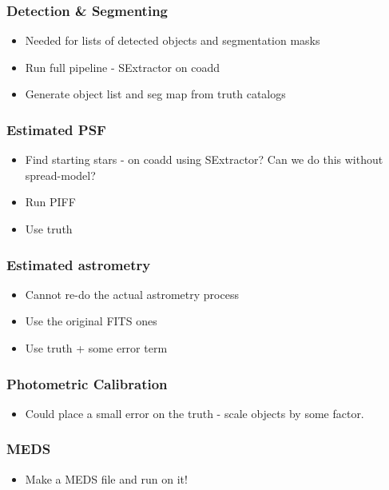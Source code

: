 \documentclass[\docopts]{\docclass}
\begin{document}
\subsubsection{Detection \& Segmenting}
\begin{itemize}
\item Needed for lists of detected objects and segmentation masks
\item Run full pipeline - SExtractor on coadd
\item Generate object list and seg map from truth catalogs
\end{itemize}

\subsubsection{Estimated PSF}
\begin{itemize}
\item Find starting stars - on coadd using SExtractor? Can we do this without spread-model?
\item Run PIFF
\item Use truth
\end{itemize}

\subsubsection{Estimated astrometry}
\begin{itemize}
\item Cannot re-do the actual astrometry process
\item Use the original FITS ones
\item Use truth + some error term
\end{itemize}

\subsubsection{Photometric Calibration}
\begin{itemize}
\item Could place a small error on the truth - scale objects by some factor.
\end{itemize}

\subsubsection{MEDS}
\begin{itemize}
\item Make a MEDS file and run on it!
\end{itemize}
\end{document}
